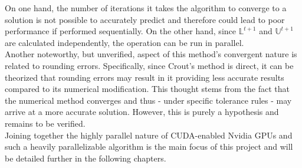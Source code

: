 On one hand, the number of iterations it takes the algorithm to converge to a solution is not possible to accurately predict and therefore could lead to poor performance if performed sequentially. On the other hand, since $ \mathbb{L}^{t+1} $ and $ \mathbb{U}^{t+1} $ are calculated independently, the operation can be run in parallel. \\
Another noteworthy, but unverified, aspect of this method's convergent nature is related to rounding errors. Specifically, since Crout's method is direct, it can be theorized that rounding errors may result in it providing less accurate results compared to its numerical modification. This thought stems from the fact that the numerical method converges and thus - under specific tolerance rules - may arrive at a more accurate solution. However, this is purely a hypothesis and remains to be verified. \\
Joining together the highly parallel nature of CUDA-enabled Nvidia GPUs and such a heavily parallelizable algorithm is the main focus of this project and will be detailed further in the following chapters.
